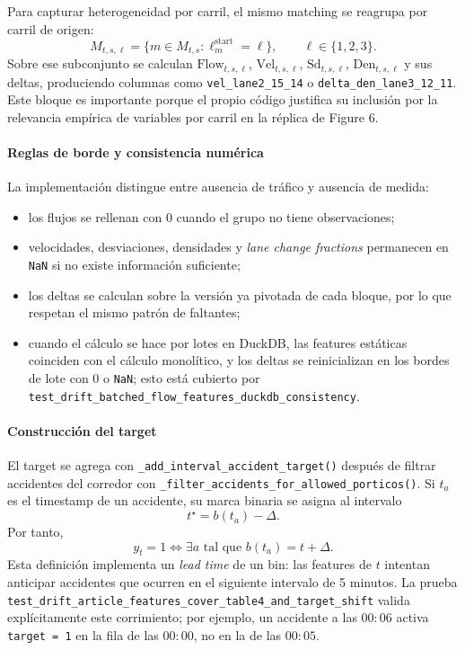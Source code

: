 Para capturar heterogeneidad por carril, el mismo matching se reagrupa por carril de origen:
\[
M_{t,s,\ell} = \{m \in M_{t,s} : \ell^{\mathrm{start}}_m = \ell\},
\qquad \ell \in \{1,2,3\}.
\]
Sobre ese subconjunto se calculan \(\mathrm{Flow}_{t,s,\ell}\), \(\mathrm{Vel}_{t,s,\ell}\), \(\mathrm{Sd}_{t,s,\ell}\), \(\mathrm{Den}_{t,s,\ell}\) y sus deltas, produciendo columnas como \texttt{vel\_lane2\_15\_14} o \texttt{delta\_den\_lane3\_12\_11}. Este bloque es importante porque el propio c\'odigo justifica su inclusi\'on por la relevancia emp\'irica de variables por carril en la r\'eplica de Figure 6.

\paragraph{Reglas de borde y consistencia num\'erica}
La implementaci\'on distingue entre ausencia de tr\'afico y ausencia de medida:
\begin{itemize}[leftmargin=*]
  \item los flujos se rellenan con \(0\) cuando el grupo no tiene observaciones;
  \item velocidades, desviaciones, densidades y \textit{lane change fractions} permanecen en \texttt{NaN} si no existe informaci\'on suficiente;
  \item los deltas se calculan sobre la versi\'on ya pivotada de cada bloque, por lo que respetan el mismo patr\'on de faltantes;
  \item cuando el c\'alculo se hace por lotes en DuckDB, las features est\'aticas coinciden con el c\'alculo monol\'itico, y los deltas se reinicializan en los bordes de lote con \(0\) o \texttt{NaN}; esto est\'a cubierto por \texttt{test\_drift\_batched\_flow\_features\_duckdb\_consistency}.
\end{itemize}

\paragraph{Construcci\'on del target}
El target se agrega con \texttt{\_add\_interval\_accident\_target()} despu\'es de filtrar accidentes del corredor con \texttt{\_filter\_accidents\_for\_allowed\_porticos()}. Si \(t_a\) es el timestamp de un accidente, su marca binaria se asigna al intervalo
\[
t^{\star} = b(t_a) - \Delta.
\]
Por tanto,
\[
y_t = 1 \iff \exists a \text{ tal que } b(t_a) = t + \Delta.
\]
Esta definici\'on implementa un \textit{lead time} de un bin: las features de \(t\) intentan anticipar accidentes que ocurren en el siguiente intervalo de 5 minutos. La prueba \texttt{test\_drift\_article\_features\_cover\_table4\_and\_target\_shift} valida expl\'icitamente este corrimiento; por ejemplo, un accidente a las \(00{:}06\) activa \texttt{target = 1} en la fila de las \(00{:}00\), no en la de las \(00{:}05\).

